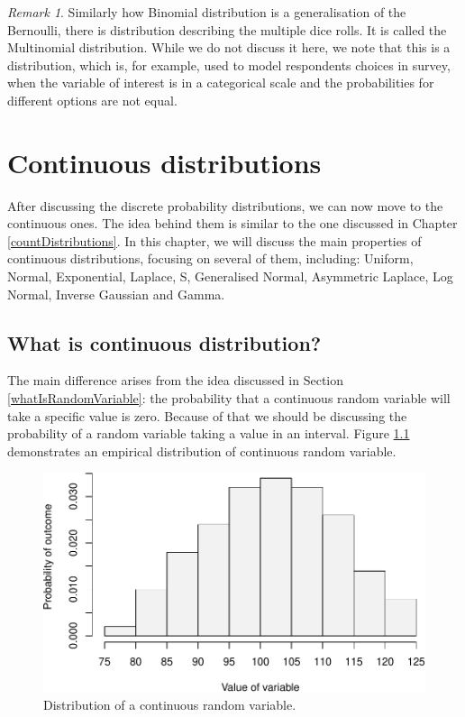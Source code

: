 \documentclass[
]{book}
\theoremstyle{definition}
\theoremstyle{definition}
\theoremstyle{definition}
\theoremstyle{definition}
\theoremstyle{remark}
\newtheorem*{remark}{Remark}
\begin{document}
\begin{remark}
Similarly how Binomial distribution is a generalisation of the Bernoulli, there is distribution describing the multiple dice rolls. It is called the Multinomial distribution. While we do not discuss it here, we note that this is a distribution, which is, for example, used to model respondents choices in survey, when the variable of interest is in a categorical scale and the probabilities for different options are not equal.
\end{remark}

\hypertarget{distributions}{%
\chapter{Continuous distributions}\label{distributions}}

After discussing the discrete probability distributions, we can now move to the continuous ones. The idea behind them is similar to the one discussed in Chapter \ref{countDistributions}. In this chapter, we will discuss the main properties of continuous distributions, focusing on several of them, including: Uniform, Normal, Exponential, Laplace, S, Generalised Normal, Asymmetric Laplace, Log Normal, Inverse Gaussian and Gamma.

\hypertarget{distributionsContinuousWhat}{%
\section{What is continuous distribution?}\label{distributionsContinuousWhat}}

The main difference arises from the idea discussed in Section \ref{whatIsRandomVariable}: the probability that a continuous random variable will take a specific value is zero. Because of that we should be discussing the probability of a random variable taking a value in an interval. Figure \ref{fig:distributionContinuousExample} demonstrates an empirical distribution of continuous random variable.

\begin{figure}
\centering
\includegraphics{Svetunkov---Statistics-for-Business-Analytics_files/figure-latex/distributionContinuousExample-1.pdf}
\caption{\label{fig:distributionContinuousExample}Distribution of a continuous random variable.}
\end{figure}
\end{document}
